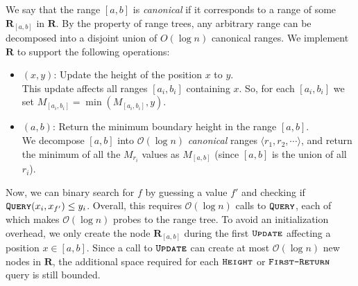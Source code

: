 We say that the range $[a,b]$ is \emph{canonical} if it corresponds to a range of some $\mathbf{R}_{[a,b]}$ in $\mathbf R$.
By the property of range trees, any arbitrary range can be decomposed into a disjoint union of $O(\log n)$ canonical ranges.
We implement $\mathbf{R}$ to support the following operations:
\begin{itemize}
    \item {}$(x,y)$: Update the height of the position $x$ to $y$.\\
    This update affects all ranges $[a_i,b_i]$ containing $x$.
    So, for each $[a_i,b_i]$ we set $M_{[a_i,b_i]} = \min\left( M_{[a_i,b_i]}, y\right)$.
    \item {}$(a,b)$: Return the minimum boundary height in the range $[a,b]$.\\
    We decompose $[a,b]$ into $\mathcal O(\log n)$ \emph{canonical} ranges $ \langle r_1, r_2,\cdots\rangle$,
    and return the minimum of all the $M_{r_i}$ values as $M_{[a,b]}$ (since $[a,b]$ is the union of all $r_i$).
\end{itemize}

Now, we can binary search for $f$ by guessing a value $f'$ and checking if $\texttt{\textsc{Query}}(x_i,x_{f'}) \le y_i$.
Overall, this requires $\mathcal O(\log n)$ calls to $\texttt{\textsc{Query}}$, each of which makes $\mathcal O(\log n)$ probes to the range tree.
To avoid an initialization overhead, we only create the node $\mathbf{R}_{[a,b]}$ during the first $\texttt{\textsc{Update}}$ affecting a position $x\in[a,b]$.
Since a call to $\texttt{\textsc{Update}}$ can create at most $\mathcal O(\log n)$ new nodes in $\mathbf R$,
the additional space required for each $\texttt{\textsc{Height}}$ or $\texttt{\textsc{First-Return}}$ query is still bounded.

